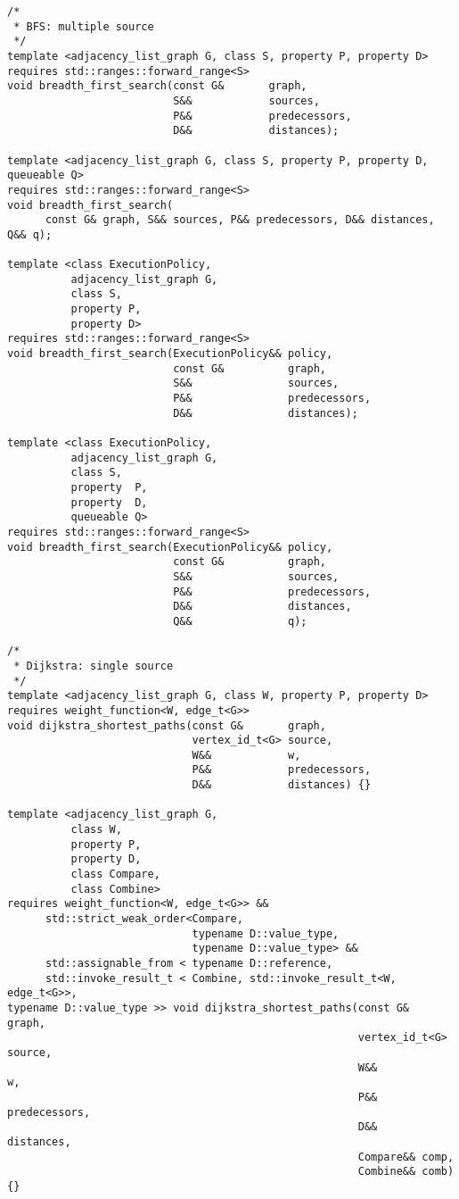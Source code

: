 \begin{lstlisting}
/*
 * BFS: multiple source
 */
template <adjacency_list_graph G, class S, property P, property D>
requires std::ranges::forward_range<S>
void breadth_first_search(const G&       graph,
                          S&&            sources,
                          P&&            predecessors,
                          D&&            distances);

template <adjacency_list_graph G, class S, property P, property D, queueable Q>
requires std::ranges::forward_range<S>
void breadth_first_search(
      const G& graph, S&& sources, P&& predecessors, D&& distances, Q&& q);

template <class ExecutionPolicy,
          adjacency_list_graph G,
          class S,
          property P,
          property D>
requires std::ranges::forward_range<S>
void breadth_first_search(ExecutionPolicy&& policy,
                          const G&          graph,
                          S&&               sources,
                          P&&               predecessors,
                          D&&               distances);

template <class ExecutionPolicy,
          adjacency_list_graph G,
          class S,
          property  P,
          property  D,
          queueable Q>
requires std::ranges::forward_range<S>
void breadth_first_search(ExecutionPolicy&& policy,
                          const G&          graph,
                          S&&               sources,
                          P&&               predecessors,
                          D&&               distances,
                          Q&&               q);

/*
 * Dijkstra: single source
 */
template <adjacency_list_graph G, class W, property P, property D>
requires weight_function<W, edge_t<G>>
void dijkstra_shortest_paths(const G&       graph,
                             vertex_id_t<G> source,
                             W&&            w,
                             P&&            predecessors,
                             D&&            distances) {}

template <adjacency_list_graph G,
          class W,
          property P,
          property D,
          class Compare,
          class Combine>
requires weight_function<W, edge_t<G>> &&
      std::strict_weak_order<Compare,
                             typename D::value_type,
                             typename D::value_type> &&
      std::assignable_from < typename D::reference,
      std::invoke_result_t < Combine, std::invoke_result_t<W, edge_t<G>>,
typename D::value_type >> void dijkstra_shortest_paths(const G&       graph,
                                                       vertex_id_t<G> source,
                                                       W&&            w,
                                                       P&&       predecessors,
                                                       D&&       distances,
                                                       Compare&& comp,
                                                       Combine&& comb) {}


\end{lstlisting}
